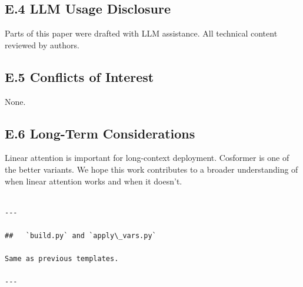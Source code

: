 \subsection{E.4 LLM Usage Disclosure}

Parts of this paper were drafted with LLM assistance. All technical content 
reviewed by authors.

\subsection{E.5 Conflicts of Interest}

None.

\subsection{E.6 Long-Term Considerations}

Linear attention is important for long-context deployment. Cosformer is one 
of the better variants. We hope this work contributes to a broader 
understanding of when linear attention works and when it doesn't.
\begin{lstlisting}

---

##   `build.py` and `apply\_vars.py`

Same as previous templates.

---
\end{lstlisting}